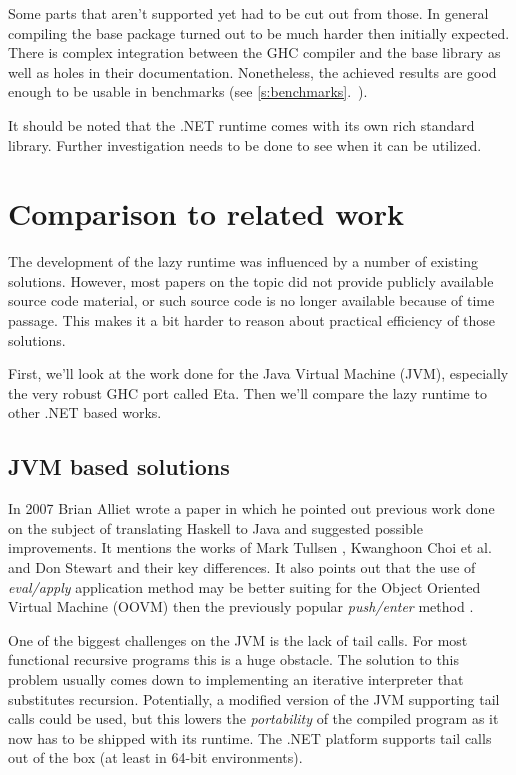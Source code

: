 \documentclass[en]{pracamgr}
\newcommand{\myref}[1]{\ref{#1}.~\textit{\nameref{#1}}}
\begin{document}
Some parts that aren't supported yet had to be cut out from those.
In general compiling the base package turned out to be much harder
then initially expected. There is complex integration between the GHC compiler and the
base library as well as holes in their documentation.
Nonetheless, the achieved results are good enough to be usable in benchmarks
(see \myref{s:benchmarks}).

It should be noted that the .NET runtime comes with its own
rich standard library. Further investigation needs to be done
to see when it can be utilized.

\chapter{Comparison to related work}\label{r:alternatives}

The development of the lazy runtime was influenced by a
number of existing solutions. However, most papers on the
topic did not provide publicly available source code
material, or such source code is no longer available because
of time passage. This makes it a bit harder
to reason about practical efficiency of those solutions.

First, we'll look at the work done for the Java Virtual Machine (JVM),
especially the very robust GHC port called Eta.
Then we'll compare the lazy runtime to other .NET based works.

\section{JVM based solutions}

In 2007 Brian Alliet wrote a paper \cite{Alliet} in which
he pointed out previous work done on the subject of
translating Haskell to Java and suggested possible improvements.
It mentions the works of Mark Tullsen \cite{Tullsen},
Kwanghoon Choi et al. \cite{Choi}
and Don Stewart \cite{Stewart} and their key differences.
It also points out that the use of \textit{eval/apply} application method
may be better suiting for the Object Oriented Virtual Machine (OOVM)
then the previously popular \textit{push/enter} method
\cite{fastcurry}.

One of the biggest challenges on the JVM is the lack of
tail calls. For most functional recursive programs this
is a huge obstacle. The solution to this problem
usually comes down to implementing an iterative interpreter
that substitutes recursion.
Potentially, a modified version of the JVM supporting tail calls
could be used, but this lowers the \textit{portability} of the
compiled program as it now has to be shipped with its runtime.
The .NET platform supports tail calls out of the box
(at least in 64-bit environments).
\end{document}
